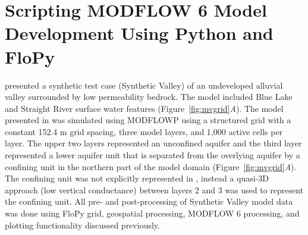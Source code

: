\documentclass[11pt, oneside]{article}  	%
\begin{document}
\section{Scripting MODFLOW 6 Model Development Using Python and FloPy}

\cite{hill1998} presented a synthetic test case (Synthetic Valley) of an undeveloped alluvial valley surrounded by low permeability bedrock. The model included Blue Lake and Straight River surface water features (Figure~\ref{fig:mvgrid}\textit{A}). The model presented in \cite{hill1998} was simulated using MODFLOWP \citep{hill1992computer} using a structured grid with a constant 152.4 m grid spacing, three model layers, and 1,000 active cells per layer. The upper two layers represented an unconfined aquifer and the third layer represented a lower aquifer unit that is separated from the overlying aquifer by a confining unit in the northern part of the model domain (Figure~\ref{fig:mvgrid}\textit{A}). The confining unit was not explicitly represented in \cite{hill1998}, instead a quasi-3D approach (low vertical conductance) between layers 2 and 3 was used to represent the confining unit. All pre- and post-processing of Synthetic Valley model data was done using FloPy grid, geospatial processing, MODFLOW 6 processing, and plotting functionality discussed previously.

\end{document}
